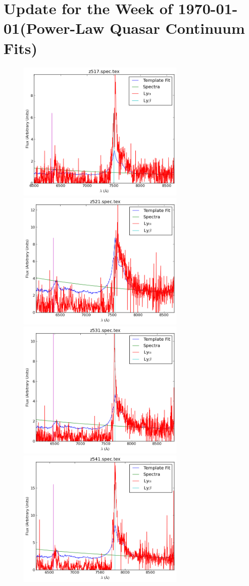 \documentclass[11pt]{article}
\begin{document}
\section*{Update for the Week of \today (Power-Law Quasar Continuum Fits)}

\begin{figure}[h]
  \centering
  \includegraphics[width=8cm]{z517_spec.png}
  \includegraphics[width=8cm]{z521_spec.png}
  \includegraphics[width=8cm]{z531_spec.png}
  \includegraphics[width=8cm]{z541_spec.png}

\end{figure}
\end{document}
